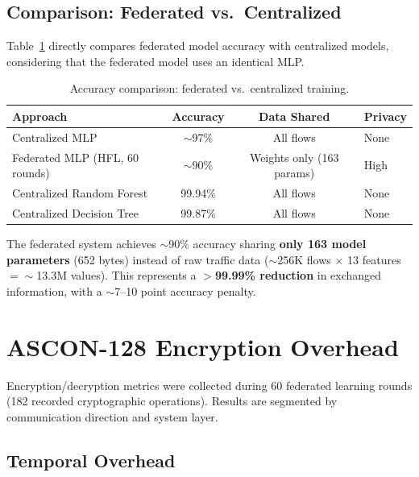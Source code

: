 \subsection{Comparison: Federated vs.\ Centralized}

Table~\ref{tab:fed_vs_central} directly compares federated model accuracy with centralized models, considering that the federated model uses an identical MLP.

\begin{table}[H]
\centering
\caption{Accuracy comparison: federated vs.\ centralized training.}
\label{tab:fed_vs_central}
\small
\begin{tabular}{l c c l}
\toprule
\textbf{Approach} & \textbf{Accuracy} & \textbf{Data Shared} & \textbf{Privacy} \\
\midrule
Centralized MLP              & $\sim$97\%    & All flows             & None \\
Federated MLP (HFL, 60 rounds) & $\sim$90\%  & Weights only (163 params) & High \\
Centralized Random Forest    & 99.94\%       & All flows             & None \\
Centralized Decision Tree    & 99.87\%       & All flows             & None \\
\bottomrule
\end{tabular}
\end{table}

The federated system achieves $\sim$90\% accuracy sharing \textbf{only 163 model parameters} (652 bytes) instead of raw traffic data ($\sim$256K flows $\times$ 13 features $= \sim$13.3M values). This represents a \textbf{$>$99.99\% reduction} in exchanged information, with a $\sim$7--10 point accuracy penalty.

\section{ASCON-128 Encryption Overhead}
\label{sec:res_ascon}

Encryption/decryption metrics were collected during 60 federated learning rounds (182 recorded cryptographic operations). Results are segmented by communication direction and system layer.

\subsection{Temporal Overhead}

